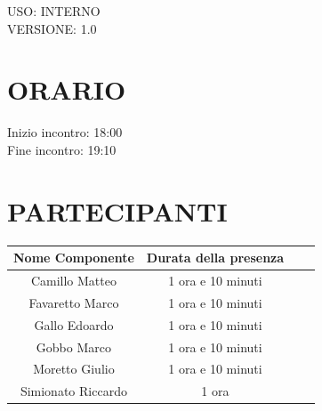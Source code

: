 \documentclass[5pt]{article}
\begin{document}
\begin{flushright}
    \begin{spacing}{1}
        USO: INTERNO\\
        VERSIONE: 1.0\\ %
    \end{spacing}
\end{flushright}


\restoregeometry

\pagebreak


\section{\Large ORARIO}
\begin{spacing}{1.5}
    {\large Inizio incontro: 18:00}\\
    {\large Fine incontro: 19:10}
\end{spacing}

\section{PARTECIPANTI}
\setlength\cellspacetoplimit{6pt}
\setlength\cellspacebottomlimit{6pt}

\begin{table}[ht]
  \begin{tabular}{|Sc|Sc|}
    \hline
    \textbf{Nome Componente} & \textbf{Durata della presenza} \\
    \hline
    Camillo Matteo & 1 ora e 10 minuti \\
    Favaretto Marco & 1 ora e 10 minuti \\
    Gallo Edoardo & 1 ora e 10 minuti \\
    Gobbo Marco & 1 ora e 10 minuti \\
    Moretto Giulio & 1 ora e 10 minuti \\
    Simionato Riccardo & 1 ora \\
    \hline
  \end{tabular}
  \label{tab:conference}
\end{table}
\end{document}
